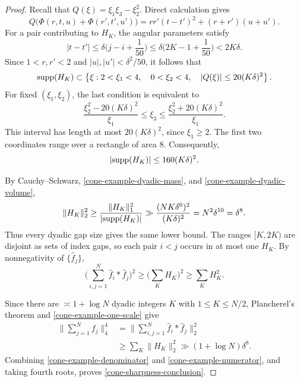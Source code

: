 \documentclass{amsart}
\numberwithin{equation}{section}
\newcommand{\wh}{\widehat}
\newcommand{\supp}{{\rm supp}}
\begin{document}
\begin{proof}
Recall that $Q(\xi)=\xi_1\xi_3-\xi_2^2$.
Direct calculation gives
\begin{equation}
\nonumber
    Q\big(\Phi(r,t,u)+\Phi(r',t',u')\big)
    =rr'(t-t')^2+(r+r')(u+u').
\end{equation}
For a pair contributing to $H_K$, the angular parameters satisfy
\[
    |t-t'|
    \leq\delta\Big(j-i+\frac1{50}\Big)
    \leq\delta\Big(2K-1+\frac1{50}\Big)
    <2K\delta.
\]
Since $1<r,r'<2$ and $|u|,|u'|<\delta^2/50$, it follows that
\[
    \supp(H_K)\subset
    \left\{\xi:
        2<\xi_1<4,\quad 0<\xi_2<4,\quad
        |Q(\xi)|\leq20(K\delta)^2
    \right\}.
\]
For fixed $(\xi_1,\xi_2)$, the last condition is equivalent to
\[
    \frac{\xi_2^2-20(K\delta)^2}{\xi_1}
    \leq\xi_3\leq
    \frac{\xi_2^2+20(K\delta)^2}{\xi_1}.
\]
This interval has length at most $20(K\delta)^2$, since $\xi_1\geq2$.
The first two coordinates range over a rectangle of area $8$.
Consequently,
\begin{equation}
\label{cone-example-dyadic-volume}
    |\supp(H_K)|\leq160(K\delta)^2.
\end{equation}

By Cauchy--Schwarz, \eqref{cone-example-dyadic-mass}, and
\eqref{cone-example-dyadic-volume},
\begin{equation}
\label{cone-example-one-scale}
    \|H_K\|_2^2
    \geq\frac{\|H_K\|_1^2}{|\supp(H_K)|}
    \gg\frac{(NK\delta^6)^2}{(K\delta)^2}
    =N^2\delta^{10}
    =\delta^8.
\end{equation}
Thus every dyadic gap size gives the same lower bound.
The ranges $[K,2K)$ are disjoint as sets of index gaps, so each pair $i<j$ occurs in at most one $H_K$. 
By nonnegativity of $\{\wh f_j\}$,
\[
    \Big(\sum_{i,j=1}^N\wh f_i*\wh f_j\Big)^2
    \geq\Big(\sum_KH_K\Big)^2
    \geq\sum_KH_K^2.
\] 

Since there are $\asymp1+\log N$ dyadic integers $K$ with
$1\leq K\leq N/2$, Plancherel's theorem and \eqref{cone-example-one-scale} give
\begin{equation}
\label{cone-example-numerator}
\begin{aligned}
    \Big\|\sum_{j=1}^Nf_j\Big\|_4^4
    &=\Big\|\sum_{i,j=1}^N\wh f_i*\wh f_j\Big\|_2^2\\
    &\geq\sum_K\|H_K\|_2^2
      \gg(1+\log N)\delta^8.
\end{aligned}
\end{equation} 
Combining \eqref{cone-example-denominator} and
\eqref{cone-example-numerator}, and taking fourth roots, proves \eqref{cone-sharpness-conclusion}.
\end{proof}
\end{document}
